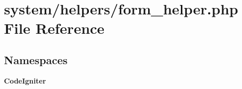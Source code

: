 \section{system/helpers/form\-\_\-helper.php File Reference}
\label{form__helper_8php}
\subsection*{Namespaces}
\begin{DoxyCompactItemize}
\item 
{\bf Code\-Igniter}
\end{DoxyCompactItemize}
